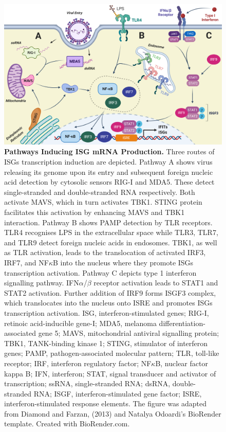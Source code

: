 \begin{figure}
    \centering
    \includegraphics[width=1\linewidth]{04. Introduction//Figs/01. IFIT transcription activation figure.png}
    \caption[Pathways Inducing ISG mRNA Production.]{\textbf{Pathways Inducing ISG mRNA Production.} Three routes of ISGs transcription induction are depicted. Pathway A shows virus releasing its genome upon its entry and subsequent foreign nucleic acid detection by cytosolic sensors RIG-I and MDA5. These detect single-stranded and double-stranded RNA respectively. Both activate MAVS, which in turn activates TBK1. STING protein facilitates this activation by enhancing MAVS and TBK1 interaction. Pathway B shows PAMP detection by TLR receptors. TLR4 recognises LPS in the extracellular space while TLR3, TLR7, and TLR9 detect foreign nucleic acids in endosomes. TBK1, as well as TLR activation, leads to the translocation of activated IRF3, IRF7, and NF\(\kappa\)B into the nucleus where they promote ISGs transcription activation. Pathway C depicts type 1 interferon signalling pathway. IFN\(\alpha\)/\(\beta\) receptor activation leads to STAT1 and STAT2 activation. Further addition of IRF9 forms ISGF3 complex, which translocates into the nucleus onto ISRE and promotes ISGs transcription activation. ISG, interferon-stimulated genes; RIG-I, retinoic acid-inducible gene-I; MDA5, melanoma differentiation-associated gene 5; MAVS, mitochondrial antiviral signalling protein; TBK1, TANK-binding kinase 1; STING, stimulator of interferon genes; PAMP, pathogen-associated molecular pattern; TLR, toll-like receptor; IRF, interferon regulatory factor; NF\(\kappa\)B, nuclear factor kappa B; IFN, interferon; STAT, signal transducer and activator of transcription; ssRNA, single-stranded RNA; dsRNA, double-stranded RNA; ISGF, interferon-stimulated gene factor; ISRE, interferon-stimulated response elements. The figure was adapted from Diamond and Farzan, (2013) \cite{Diamond2013TheProteins} and Natalya Odoardi's BioRender template. Created with BioRender.com.}
    \label{fig:Pathways Inducing ISG mRNA Production.}
\end{figure}


